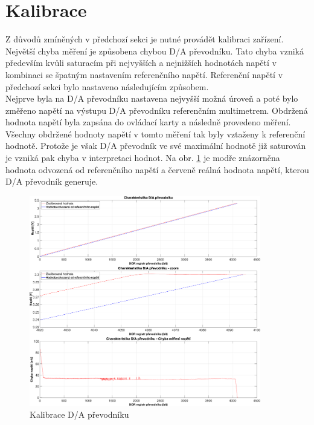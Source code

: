 \clearpage
\section{Kalibrace}
Z důvodů zmíněných v předchozí sekci je nutné provádět kalibraci zařízení. Největší chyba měření je způsobena
chybou D/A převodníku. Tato chyba vzniká především kvůli saturacím při nejvyšších a nejnižších hodnotách napětí
v kombinaci se špatným nastavením referenčního napětí. Referenční napětí v předchozí sekci bylo nastaveno
následujícím způsobem.\\
Nejprve byla na D/A převodníku nastavena nejvyšší možná úroveň a poté bylo změřeno napětí na výstupu D/A převodníku
referenčním multimetrem. Obdržená hodnota napětí byla zapsána do ovládací karty a následně provedeno měření.
Všechny obdržené hodnoty napětí v tomto měření tak byly vztaženy k referenční hodnotě. Protože je však D/A převodník
ve své maximální hodnotě již saturován je vzniká pak chyba v interpretaci hodnot. Na obr. \ref{fig: 10hourTest calib DAC}
je modře znázorněna hodnota odvozená od referenčního napětí a červeně reálná hodnota napětí, kterou D/A převodník generuje.\\

\begin{figure}[ht!]
    \centering
    \includegraphics[width = 0.9\textwidth]{obrazky/matlab_generated/VOLTAGE_TESTER/calib_DAC.eps}
    \caption{Kalibrace D/A převodníku}
    \label{fig: 10hourTest calib DAC}
\end{figure}

